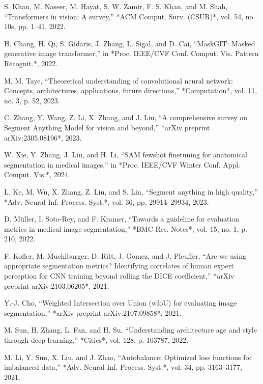\documentclass[letterpaper, 10 pt, conference]{ieeeconf}  %
\begin{document}
\begin{thebibliography}{99}
 S. Khan, M. Naseer, M. Hayat, S. W. Zamir, F. S. Khan, and M. Shah, ``Transformers in vision: A survey,'' *ACM Comput. Surv. (CSUR)*, vol. 54, no. 10s, pp. 1–41, 2022.

 H. Chang, H. Qi, S. Gidaris, J. Zhang, L. Sigal, and D. Cai, ``MaskGIT: Masked generative image transformer,'' in *Proc. IEEE/CVF Conf. Comput. Vis. Pattern Recognit.*, 2022.

 M. M. Taye, ``Theoretical understanding of convolutional neural network: Concepts, architectures, applications, future directions,'' *Computation*, vol. 11, no. 3, p. 52, 2023.

 C. Zhang, Y. Wang, Z. Li, X. Zhang, and J. Liu, ``A comprehensive survey on Segment Anything Model for vision and beyond,'' *arXiv preprint arXiv:2305.08196*, 2023.

 W. Xie, Y. Zhang, J. Liu, and H. Li, ``SAM fewshot finetuning for anatomical segmentation in medical images,'' in *Proc. IEEE/CVF Winter Conf. Appl. Comput. Vis.*, 2024.

 L. Ke, M. Wu, X. Zhang, Z. Liu, and S. Lin, ``Segment anything in high quality,'' *Adv. Neural Inf. Process. Syst.*, vol. 36, pp. 29914–29934, 2023.

 D. Müller, I. Soto-Rey, and F. Kramer, ``Towards a guideline for evaluation metrics in medical image segmentation,'' *BMC Res. Notes*, vol. 15, no. 1, p. 210, 2022.

 F. Kofler, M. Muehlburger, D. Ritt, J. Gomez, and J. Pfeuffer, ``Are we using appropriate segmentation metrics? Identifying correlates of human expert perception for CNN training beyond rolling the DICE coefficient,'' *arXiv preprint arXiv:2103.06205*, 2021.

 Y.-J. Cho, ``Weighted Intersection over Union (wIoU) for evaluating image segmentation,'' *arXiv preprint arXiv:2107.09858*, 2021.

 M. Sun, H. Zhang, L. Fan, and H. Su, ``Understanding architecture age and style through deep learning,'' *Cities*, vol. 128, p. 103787, 2022.

 M. Li, Y. Sun, X. Liu, and J. Zhao, ``Autobalance: Optimized loss functions for imbalanced data,'' *Adv. Neural Inf. Process. Syst.*, vol. 34, pp. 3163–3177, 2021.

\end{thebibliography}
\end{document}
